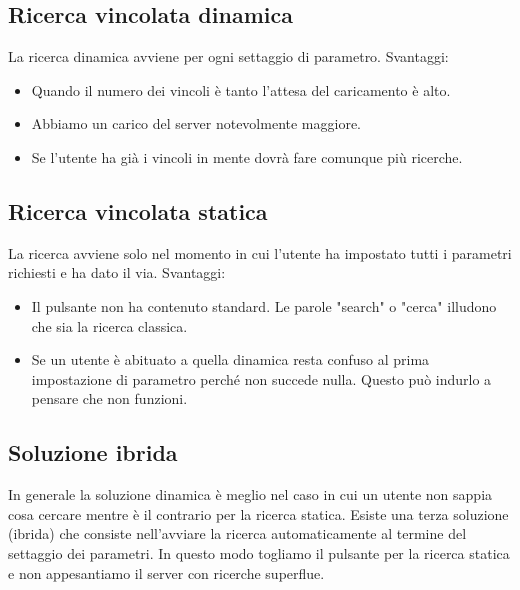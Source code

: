 					
		\subsection{Ricerca vincolata dinamica}
			La ricerca dinamica avviene per ogni settaggio di parametro.
			Svantaggi:
			\begin{itemize}
				\item Quando il numero dei vincoli è tanto l'attesa del caricamento è alto.
				\item Abbiamo un carico del server notevolmente maggiore.
				\item Se l'utente ha già i vincoli in mente dovrà fare comunque più ricerche.
			\end{itemize}
	
		\subsection{Ricerca vincolata statica}
			La ricerca avviene solo nel momento in cui l'utente ha impostato tutti i parametri richiesti e ha dato il via.
			Svantaggi:
			\begin{itemize}
				\item Il pulsante non ha contenuto standard. Le parole "search" o "cerca" illudono che sia la ricerca classica. 
				\item Se un utente è abituato a quella dinamica resta confuso al prima impostazione di parametro perché non succede nulla. Questo può indurlo a pensare che non funzioni.
			\end{itemize}
		
		\subsection{Soluzione ibrida}
			In generale la soluzione dinamica è meglio nel caso in cui un utente non sappia cosa cercare mentre è il contrario per la ricerca statica. Esiste una terza soluzione (ibrida) che consiste nell'avviare la ricerca automaticamente al termine del settaggio dei parametri. In questo modo togliamo il pulsante per la ricerca statica e non appesantiamo il server con ricerche superflue.
		
